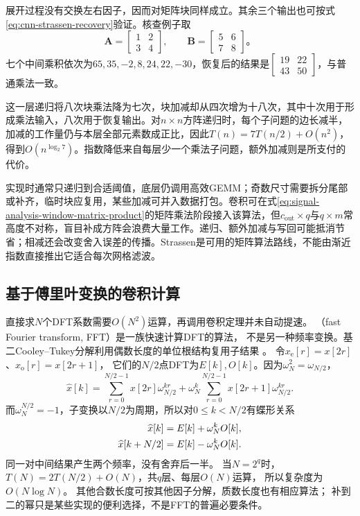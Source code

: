 展开过程没有交换左右因子，因而对矩阵块同样成立。其余三个输出也可按式\eqref{eq:cnn-strassen-recovery}验证。核查例子取
\[
  \bm A=\begin{bmatrix}1&2\\3&4\end{bmatrix},\qquad
  \bm B=\begin{bmatrix}5&6\\7&8\end{bmatrix}\text{。}
\]
七个中间乘积依次为$65,35,-2,8,24,22,-30$，恢复后的结果是$\left[\begin{smallmatrix}19&22\\43&50\end{smallmatrix}\right]$，与普通乘法一致。

这一层递归将八次块乘法降为七次，块加减却从四次增为十八次，其中十次用于形成乘法输入，八次用于恢复输出。对$n\times n$方阵递归时，每个子问题的边长减半，加减的工作量仍与本层全部元素数成正比，因此$T(n)=7T(n/2)+O(n^2)$，得到$O(n^{\log_2 7})$。指数降低来自每层少一个乘法子问题，额外加减则是所支付的代价。

实现时通常只递归到合适阈值，底层仍调用高效GEMM；奇数尺寸需要拆分尾部或补齐，临时块应复用，某些加减可并入数据打包。卷积可在式\eqref{eq:signal-analysis-window-matrix-product}的矩阵乘法阶段接入该算法，但$c_{\mathrm{out}}\times q$与$q\times m$常高度不对称，盲目补成方阵会浪费大量工作。递归、额外加减与写回可能抵消节省；相减还会改变舍入误差的传播。Strassen是可用的矩阵算法路线，不能由渐近指数直接推出它适合每次网格滤波。

\subsection{基于傅里叶变换的卷积计算}\label{sec:signal-analysis-fast-fft}\label{sec:cnn-fft}

直接求$N$个DFT系数需要$O(N^2)$运算，再调用卷积定理并未自动提速。
（fast Fourier transform, FFT）是一族快速计算DFT的算法，
不是另一种频率变换。基二Cooley--Tukey分解利用偶数长度的单位根结构复用子结果
。
令$x_{\mathrm e}[r]=x[2r]$、$x_{\mathrm o}[r]=x[2r+1]$，
它们的$N/2$点DFT为$E[k],O[k]$。因为$\omega_N^2=\omega_{N/2}$，
\[
  \widehat x[k]
  =\sum_{r=0}^{N/2-1}x[2r]\omega_{N/2}^{kr}
   +\omega_N^k\sum_{r=0}^{N/2-1}x[2r+1]\omega_{N/2}^{kr}.
\]
而$\omega_N^{N/2}=-1$，子变换以$N/2$为周期，所以对$0\leq k<N/2$有蝶形关系
\begin{align}
  \widehat x[k]&=E[k]+\omega_N^kO[k],\notag\\
  \widehat x[k+N/2]&=E[k]-\omega_N^kO[k].
  \label{eq:signal-analysis-fft-butterfly}
\end{align}
\BookEquationAliases{\label{eq:cnn-fft-butterfly}}
同一对中间结果产生两个频率，没有舍弃后一半。
当$N=2^q$时，$T(N)=2T(N/2)+O(N)$，共$q$层、每层$O(N)$运算，
所以复杂度为$O(N\log N)$。
其他合数长度可按其他因子分解，质数长度也有相应算法；
补到二的幂只是某些实现的便利选择，不是FFT的普遍必要条件。

